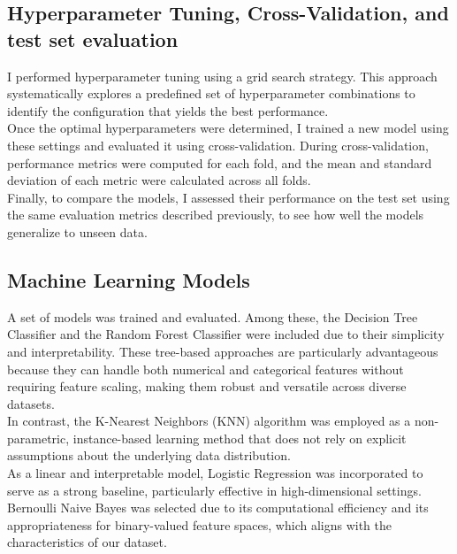 \subsection{Hyperparameter Tuning, Cross-Validation, and test set evaluation}
I performed hyperparameter tuning using a grid search strategy. This approach systematically explores a predefined set of hyperparameter combinations to identify the configuration that yields the best performance.\\

\noindent Once the optimal hyperparameters were determined, I trained a new model using these settings and evaluated it using cross-validation. During cross-validation, performance metrics were computed for each fold, and the mean and standard deviation of each metric were calculated across all folds.\\

\noindent
Finally, to compare the models, I assessed their performance on the test set using the same evaluation metrics described previously, to see how well the models generalize to unseen data. 


\subsection{Machine Learning Models}
A set of models was trained and evaluated. Among these, the Decision Tree Classifier and the Random Forest Classifier were included due to their simplicity and interpretability. These tree-based approaches are particularly advantageous because they can handle both numerical and categorical features without requiring feature scaling, making them robust and versatile across diverse datasets.\\
In contrast, the K-Nearest Neighbors (KNN) algorithm was employed as a non-parametric, instance-based learning method that does not rely on explicit assumptions about the underlying data distribution.\\
As a linear and interpretable model, Logistic Regression was incorporated to serve as a strong baseline, particularly effective in high-dimensional settings.\\
Bernoulli Naive Bayes was selected due to its computational efficiency and its appropriateness for binary-valued feature spaces, which aligns with the characteristics of our dataset.\\